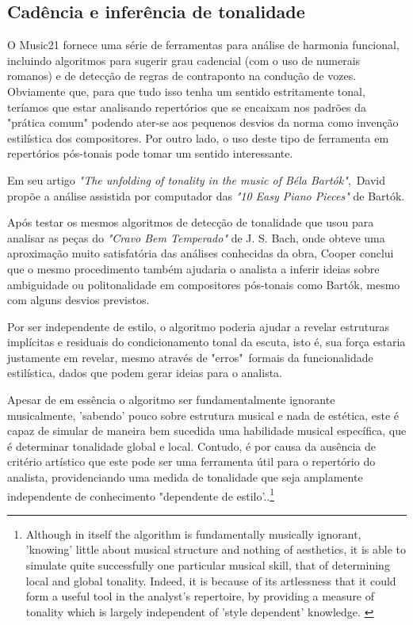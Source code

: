 \documentclass[
	12pt,				%
	openright,			%
	twoside,			%
	a4paper,			%
	english,			%
	french,				%
	spanish,			%
	brazil				%
	]{abntex2}
\begin{document}
\subsection{Cadência e inferência de tonalidade}


O Music21 fornece uma série de ferramentas para análise de harmonia funcional, incluindo algoritmos para sugerir grau cadencial (com o uso de numerais romanos) e de detecção de regras de contraponto na condução de vozes. Obviamente que, para que tudo isso tenha um sentido estritamente tonal, teríamos que estar analisando repertórios que se encaixam nos padrões da "prática comum" \cite[p. 354]{temperley2001cognition} podendo ater-se aos pequenos desvios da norma como invenção estilística dos compositores. Por outro lado, o uso deste tipo de ferramenta em repertórios pós-tonais pode tomar um sentido interessante. 

Em seu artigo \textit{"The unfolding of tonality in the music of Béla Bartók"},\ David  propõe a análise assistida por computador das \textit{"10 Easy Piano Pieces"} de Bartók. 

Após testar os mesmos algoritmos de detecção de tonalidade que usou para analisar as peças do \textit{"Cravo Bem Temperado"} de J. S. Bach, onde obteve uma aproximação muito satisfatória das análises conhecidas da obra, Cooper conclui que o mesmo procedimento também ajudaria o analista a inferir ideias sobre ambiguidade ou politonalidade em compositores pós-tonais como Bartók,  mesmo com alguns desvios previstos.

Por ser independente de estilo, o algoritmo poderia ajudar a revelar estruturas implícitas e residuais do condicionamento tonal da escuta, isto é, sua força estaria justamente em revelar, mesmo através de "erros"\ formais da funcionalidade estilística, dados que podem gerar ideias para o analista.

\begin{citacao}
Apesar de em essência o algoritmo ser fundamentalmente ignorante musicalmente, 'sabendo' pouco sobre estrutura musical e nada de estética, este é capaz de simular de maneira bem sucedida uma habilidade musical específica, que é determinar tonalidade global e local. Contudo, é por causa da ausência de critério artístico que este pode ser uma ferramenta útil para o repertório do analista, providenciando uma medida de tonalidade que seja amplamente independente de conhecimento "dependente de estilo'.\cite[p. 34-35]{cooper1998unfolding}.\footnote{Although in itself the algorithm is fundamentally musically ignorant, 'knowing' little about musical structure and nothing of aesthetics, it is able to simulate quite successfully one particular musical skill, that of determining local and global tonality. Indeed, it is because of its artlessness that it could form a useful tool in the analyst's repertoire, by providing a measure of tonality which is largely independent of 'style dependent' knowledge. \cite[p. 34-35]{cooper1998unfolding}}
\end{citacao}
\end{document}
